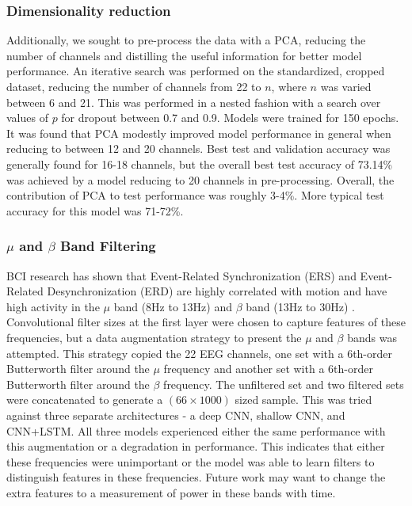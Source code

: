 \documentclass[10pt,twocolumn,letterpaper]{article}
\begin{document}
\subsubsection{Dimensionality reduction}
Additionally, we sought to pre-process the data with a PCA, reducing the number
of channels and distilling the useful information for better model performance.
An iterative search was performed on the standardized, cropped dataset,
reducing the number of channels from 22 to $n$, where $n$ was varied between 6
and 21. 
This was performed in a nested fashion with a search over values of $p$ for
dropout between 0.7 and 0.9. Models were trained for 150 epochs. It was found
that PCA modestly improved model performance in general when reducing to
between 12 and 20 channels. Best test and validation accuracy was generally
found for 16-18 channels, but the overall best test accuracy of 73.14\% was
achieved by a model reducing to 20 channels in pre-processing. 
Overall, the contribution of PCA to test performance was roughly 3-4\%.
More typical test accuracy for this model was 71-72\%.


\subsubsection{$\mu$ and $\beta$ Band Filtering}


BCI research has shown that Event-Related Synchronization (ERS) and
Event-Related Desynchronization (ERD) are highly correlated with motion and have
high activity in the $\mu$ band (8Hz to 13Hz) and $\beta$ band (13Hz to 30Hz)
\cite{yang2013subject}.
Convolutional filter sizes at the first layer were chosen to capture features of
these frequencies, but a data augmentation strategy to present the $\mu$ and
$\beta$ bands was attempted. This strategy copied the 22 EEG channels, one set
with a 6th-order Butterworth filter around the $\mu$ frequency and another set
with a 6th-order Butterworth filter around the $\beta$ frequency. The unfiltered
set and two filtered sets were concatenated to generate a $(66 \times 1000)$
sized sample. This was tried against three separate architectures - a deep CNN,
shallow CNN, and CNN+LSTM. All three models experienced either the same
performance with this augmentation or a degradation in performance. This
indicates that either these frequencies were unimportant or the model was
able to learn filters to distinguish features in these frequencies. Future work
may want to change the extra features to a measurement of power in these bands
with time.
\end{document}
